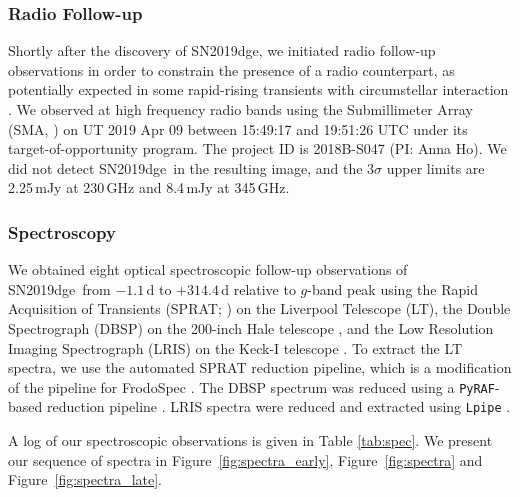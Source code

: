 \documentclass[twocolumn]{aastex63}
\newcommand{\name}{SN2019dge}
\begin{document}
\begin{CJK*}{UTF8}{gbsn}
\subsubsection{Radio Follow-up}
Shortly after the discovery of \name, we initiated radio follow-up observations in order to constrain the 
presence of a radio counterpart, as potentially expected in some rapid-rising transients with 
circumstellar interaction \citep{Weiler2007, Horesh2013, HoPhinney2019}. We observed at high 
frequency radio bands using the 
Submillimeter Array (SMA, \citealt{Ho2004}) on UT 2019 Apr 09 between 15:49:17 and 19:51:26 UTC 
under its target-of-opportunity program. The 
project ID is 2018B-S047 (PI: Anna Ho). We did not detect \name\ in the resulting image, and the 
3$\sigma$ upper limits are 2.25\,mJy at 230\,GHz and 8.4\,mJy at 
345\,GHz. 

\subsubsection{Spectroscopy}
We obtained eight optical spectroscopic follow-up observations of \name\ from $-1.1$\,d to 
$+314.4$\,d relative 
to $g$-band peak using the Rapid Acquisition of Transients (SPRAT; \citealt{Piascik2014}) on the 
Liverpool Telescope (LT), the Double Spectrograph (DBSP) on the 200-inch Hale telescope 
\citep{Oke1982}, and the Low Resolution Imaging Spectrograph (LRIS) on the Keck-I telescope 
\citep{Oke1995}. To extract the LT spectra, we use the automated SPRAT reduction pipeline, which is a 
modification of the pipeline for FrodoSpec \citep{Barnsley2012}. The DBSP spectrum was reduced using 
a \texttt{PyRAF}-based reduction pipeline \citep{Bellm2016}. LRIS 
spectra were reduced and extracted using \texttt{Lpipe} \citep{Perley2019lpipe}. 

A log of our spectroscopic observations is given in Table \ref{tab:spec}. We 
present our sequence of spectra in Figure~\ref{fig:spectra_early}, Figure~\ref{fig:spectra} and 
Figure~\ref{fig:spectra_late}.


\end{CJK*}
\end{document}
